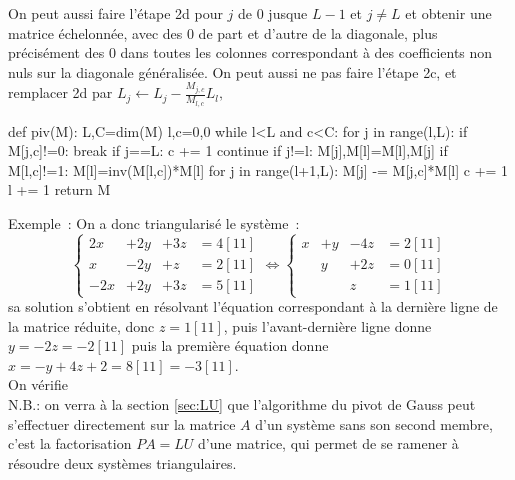 \documentclass[a4paper,11pt]{book}
\begin{document}
\begin{giacjshere}
On peut aussi faire l'\'etape 2d pour $j$ de 0 jusque $L-1$ et $j\neq
L$ et obtenir une matrice \'echelonn\'ee, avec des 0 de part et
d'autre de la diagonale, plus pr\'ecis\'ement des 0 dans toutes les
colonnes correspondant \`a des coefficients non nuls sur la diagonale
g\'en\'eralis\'ee. On peut aussi ne pas faire l'\'etape 2c, et
remplacer 2d par $ L_j \leftarrow L_j - \frac{M_{j,c}}{M_{l,c}} L_l, $
\begin{giaconload}
def piv(M):
    L,C=dim(M)
    l,c=0,0
    while l<L and c<C:
        for j in range(l,L):
            if M[j,c]!=0: 
                break
        if j==L:
            c += 1
            continue
        if j!=l: 
            M[j],M[l]=M[l],M[j]
        if M[l,c]!=1:
            M[l]=inv(M[l,c])*M[l]
        for j in range(l+1,L):
            M[j] -= M[j,c]*M[l]
        c += 1
        l += 1
    return M
\end{giaconload}
Exemple~:
On a donc triangularis\'e le syst\`eme~:
$$ \left\{
\begin{array}{cccc}
2x&+2y&+3z&=4 [11]\\
x&-2y&+z&=2 [11] \\
-2x&+2y&+3z&=5 [11]
\end{array} \right.
\Leftrightarrow
\left\{\begin{array}{cccc}
x&+y&-4z&=2 [11]\\
  &y&+2z&=0 [11] \\
  & &z&=1 [11]
\end{array} \right.
$$
sa solution s'obtient en r\'esolvant l'\'equation correspondant \`a la derni\`ere
ligne de la matrice r\'eduite, donc $z=1 [11]$, puis
l'avant-derni\`ere ligne donne $y=-2z=-2[11]$ puis la premi\`ere
\'equation donne $x=-y+4z+2=8[11]=-3[11]$.\\
On v\'erifie\\
N.B.: on verra \`a la section \ref{sec:LU}
que l'algorithme du pivot de Gauss peut s'effectuer directement sur la
matrice $A$ d'un syst\`eme sans son second membre, c'est la factorisation
$PA=LU$ d'une matrice, qui permet de se ramener \`a r\'esoudre
deux syst\`emes triangulaires.


\end{giacjshere}
\end{document}
